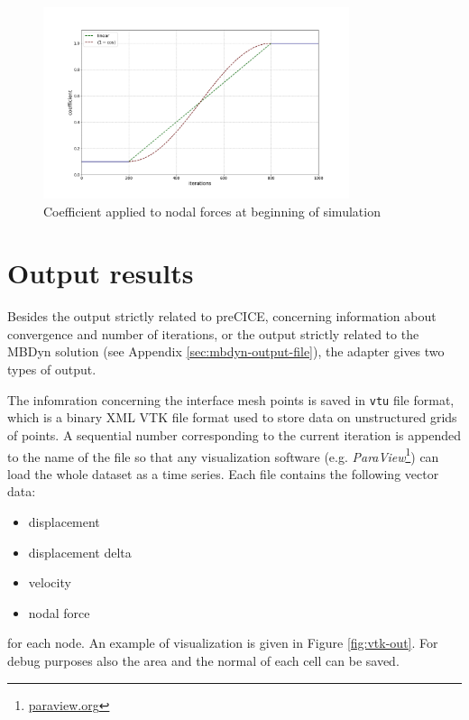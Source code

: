 

\begin{figure}[htbp!]
	\centering
	\includegraphics[width=0.8\textwidth]{images/coeff.png}
	\caption{Coefficient applied to nodal forces at beginning of simulation}
	\label{fig:sim-coeff}
\end{figure}


\section{Output results}
\label{sec:mbdyn-adapter-output}

Besides the output strictly related to preCICE, concerning information about convergence and number of iterations, or the output strictly related to the MBDyn solution (see Appendix \ref{sec:mbdyn-output-file}), the adapter gives two types of output.

The infomration concerning the interface mesh points is saved in \texttt{vtu} file format, which is a binary XML VTK  file format used to store data on unstructured grids of points. A sequential number corresponding to the current iteration is appended to the name of the file so that any visualization software (e.g. \textit{ParaView}\footnote{\href{https://www.paraview.org/}{paraview.org}}) can load the whole dataset as a time series. Each file contains the following vector data:

\begin{itemize}
    \item displacement
    \item displacement delta
    \item velocity
    \item nodal force
\end{itemize}

for each node. An example of visualization is given in Figure \ref{fig:vtk-out}. For debug purposes also the area and the normal of each cell can be saved. 

